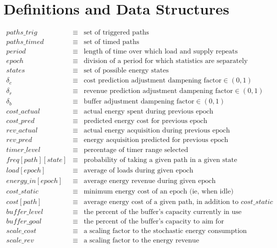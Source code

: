 \documentclass{article}
\begin{document}
\section{Definitions and Data Structures}
\begin{eqnarray*}
{paths\_trig} & \equiv & \mbox{set of triggered paths}\\
{paths\_timed} & \equiv & \mbox{set of timed paths}\\
{period} & \equiv & \mbox{length of time over which load and supply repeats}\\
{epoch} & \equiv & \mbox{division of a period for which statistics are separately}\\
{states} & \equiv & \mbox{set of possible energy states} \\
\delta_c & \equiv & \mbox{cost prediction adjustment dampening factor} \in(0,1)\\
\delta_r & \equiv & \mbox{revenue prediction adjustment dampening factor} \in(0,1)\\
\delta_b & \equiv & \mbox{buffer adjustment dampening factor} \in(0,1)\\
{cost\_actual} & \equiv  & \mbox{actual energy spent during previous epoch}\\
{cost\_pred}   & \equiv  & \mbox{predicted energy cost for previous epoch}\\
{rev\_actual} & \equiv  & \mbox{actual energy acquisition during previous epoch}\\
{rev\_pred}   & \equiv  & \mbox{energy acquisition predicted for previous epoch}\\
{timer\_level} & \equiv & \mbox{percentage of timer range selected} \\
{freq}[{path}][{state}] & \equiv  &\mbox{probability of taking a given path in a given state}\\
{load}[{epoch}] & \equiv & \mbox{average of loads during given epoch}\\
{energy\_in}[{epoch}] & \equiv & \mbox{average energy revenue during given epoch}\\
{cost\_static} & \equiv & \mbox{minimum energy cost of an epoch (ie, when idle)}\\
{cost}[{path}] & \equiv & \mbox{average energy cost of a given path, in addition to }{cost\_static}\\
{buffer\_level} & \equiv & \mbox{the percent of the buffer's capacity currently in use}\\
{buffer\_goal} & \equiv & \mbox{the percent of the buffer's capacity to aim for}\\
{scale\_cost} & \equiv & \mbox{a scaling factor to the stochastic energy consumption}\\
{scale\_rev} & \equiv & \mbox{a scaling factor to the energy revenue}\\
\end{eqnarray*}
\end{document}
